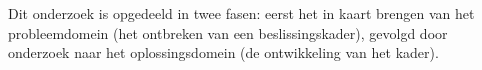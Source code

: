 
\chapter{}%
\label{ch:resultaten}


Dit onderzoek is opgedeeld in twee fasen: eerst het in kaart brengen van het probleemdomein (het ontbreken van een beslissingskader), gevolgd door onderzoek naar het oplossingsdomein (de ontwikkeling van het kader).

